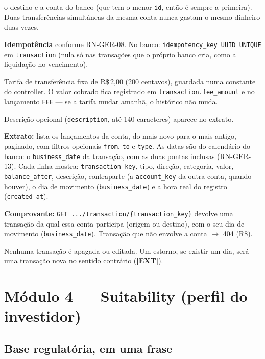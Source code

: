 \documentclass[11pt,a4paper]{article}
\newcommand{\obr}{\textbf{[OBR]}}          %
\newcommand{\dec}{\textbf{[DEC]}}          %
\newcommand{\ext}{\textbf{[EXT]}}          %
\newcommand{\rs}{R\$\,}
\newcommand{\tb}[1]{\texttt{#1}}           %
\begin{document}
\begin{regras}
  o destino e a conta do banco (que tem o menor \tb{id}, então é sempre a primeira). Duas
  transferências simultâneas da mesma conta nunca gastam o mesmo dinheiro duas vezes.
  \item[RN-MOV-09 \obr] \textbf{Idempotência} conforme RN-GER-08. No banco:
  \tb{idempotency_key UUID UNIQUE} em \tb{transaction} (nula só nas transações que o próprio banco
  cria, como a liquidação no vencimento).
  \item[RN-MOV-10 \dec] Tarifa de transferência fixa de \rs 2,00 (200 centavos), guardada numa
  constante do controller. O valor cobrado fica registrado em \tb{transaction.fee_amount} e no
  lançamento \tb{FEE} --- se a tarifa mudar amanhã, o histórico não muda.
  \item[RN-MOV-11 \dec] Descrição opcional (\tb{description}, até 140 caracteres) aparece no extrato.
  \item[RN-MOV-12 \obr] \textbf{Extrato:} lista os lançamentos da conta, do mais novo para o mais
  antigo, paginado, com filtros opcionais \tb{from}, \tb{to} e \tb{type}. As datas são do
  calendário do banco: o \tb{business_date} da transação, com as duas pontas inclusas (RN-GER-13).
  Cada linha mostra: \tb{transaction_key}, tipo, direção, categoria, valor, \tb{balance_after},
  descrição, contraparte (a \tb{account_key} da outra conta, quando houver), o dia de movimento
  (\tb{business_date}) e a hora real do registro (\tb{created_at}).
  \item[RN-MOV-13 \obr] \textbf{Comprovante:} \tb{GET .../transaction/\{transaction_key\}} devolve
  uma transação da qual essa conta participa (origem ou destino), com o seu dia de movimento
  (\tb{business_date}). Transação que não envolve a conta $\to$ 404 (R8).
  \item[RN-MOV-14 \obr] Nenhuma transação é apagada ou editada. Um estorno, se existir um dia, será
  uma transação nova no sentido contrário (\ext).
\end{regras}

\section{Módulo 4 --- Suitability (perfil do investidor)}

\subsection{Base regulatória, em uma frase}
\end{document}
